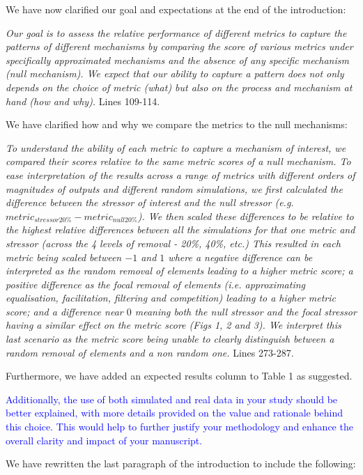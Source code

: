 \documentclass[
]{article}
\begin{document}
We have now clarified our goal and expectations at the end of the introduction:

\textit{Our goal is to assess the relative performance of different metrics to capture the patterns of different mechanisms by comparing the score of various metrics under specifically approximated mechanisms and the absence of any specific mechanism (null mechanism).
We expect that our ability to capture a pattern does not only depends on the choice of metric (what) but also on the process and mechanism at hand (how and why).}
Lines 109-114.

We have clarified how and why we compare the metrics to the null mechanisms:

\textit{To understand the ability of each metric to capture a mechanism of interest, we compared their scores relative to the same metric scores of a null mechanism.
To ease interpretation of the results across a range of metrics with different orders of magnitudes of outputs and different random simulations, we first calculated the difference between the stressor of interest and the null stressor (e.g. $metric_{stressor20\%} - metric_{null20\%}$).
We then scaled these differences to be relative to the highest relative differences between all the simulations for that one metric and stressor (across the 4 levels of removal - 20\%, 40\%, etc.)
This resulted in each metric being scaled between $-1$ and $1$ where a negative difference can be interpreted as the random removal of elements leading to a higher metric score; a positive difference as the focal removal of elements (i.e. approximating equalisation, facilitation, filtering and competition) leading to a higher metric score; and a difference near $0$ meaning both the null stressor and the focal stressor having a similar effect on the metric score (Figs 1, 2 and 3).
We interpret this last scenario as the metric score being unable to clearly distinguish between a random removal of elements and a non random one.}
Lines 273-287.

Furthermore, we have added an expected results column to Table 1 as suggested.

\textcolor{blue}{Additionally, the use of both simulated and real data in your study should be better explained, with more details provided on the value and rationale behind this choice.
This would help to further justify your methodology and enhance the overall clarity and impact of your manuscript.}

We have rewritten the last paragraph of the introduction to include the following:
\end{document}

